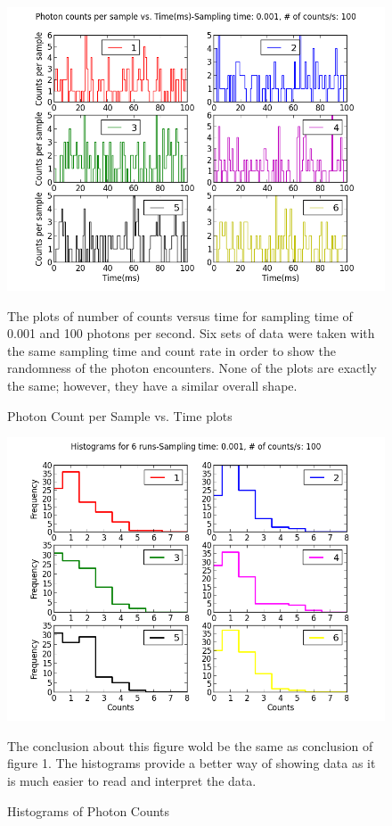 \documentclass[letterpaper,12pt]{article}
\begin{document}
\begin{figure}
\centering
\includegraphics[scale=0.7]{ex_1_plot_1.png}
\caption{ Photon Count per Sample vs. Time plots}
The plots of number of counts versus time for sampling time of 0.001 and 100 photons per second. Six sets of data were taken with the same sampling time and count rate in order to show the randomness of the photon encounters. None of the plots are exactly the same; however, they have a similar overall shape.
\end{figure}

\begin{figure}
\centering
\includegraphics[scale=0.7]{histograms.png}
\caption{Histograms of Photon Counts}
The conclusion about this figure wold be the same as conclusion of figure 1.  The histograms provide a better way of showing data as it is much easier to read and interpret the data.
\end{figure}
\end{document}
